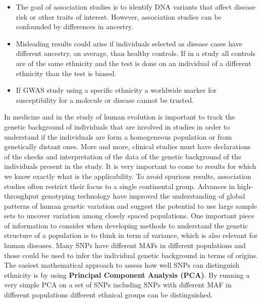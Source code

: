 	\begin{multicols}{2}
		\begin{itemize}
			\item The goal of association studies is to identify DNA variants that affect disease risk or other traits of interest.
				However, association studies can be confounded by differences in ancestry.
			\item Misleading results could arise if individuals selected as disease cases have different ancestry, on average, than healthy controls.
				If in a study all controls are of the same ethnicity and the test is done on an individual of a different ethnicity than the test is biased.
			\item If GWAS study using a specific ethnicity a worldwide marker for susceptibility for a molecule or disease cannot be trusted.
		\end{itemize}
	\end{multicols}

In medicine and in the study of human evolution is important to track the genetic background of individuals that are involved in studies in order to understand if the individuals are form a homogeneous population or from genetically distant ones.
More and more, clinical studies must have declarations of the checks and interpretation of the data of the genetic background of the individuals present in the study.
It is very important to come to results for which we know exactly what is the applicability.
To avoid spurious results, association studies often restrict their focus to a single continental group.
Advances in high-throughput genotyping technology have improved the understanding of global patterns of human genetic variation and suggest the potential to use large sample sets to uncover variation among closely spaced populations.
One important piece of information to consider when developing methods to understand the genetic structure of a population is to think in term of variance, which is also relevant for human diseases.
Many SNPs have different MAFs in different populations and those could be used to infer the individual genetic background in terms of origins.
The easiest mathematical approach to assess how well SNPs can distinguish ethnicity is by using \textbf{Principal Component Analysis (PCA)}.
By running a very simple PCA on a set of SNPs including SNPs with different MAF in different populations different ethnical groups can be distinguished.

